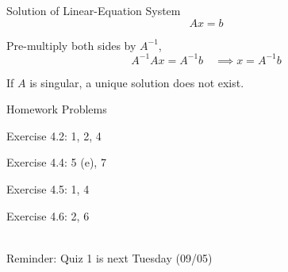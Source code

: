 \documentclass{./../../Latex/teaching_slides}
\begin{document}
\begin{frame}{Solution of Linear-Equation System}
$$ Ax = b $$
\pause

\vspace{1em}
Pre-multiply both sides by $A^{-1}$, 
$$ A^{-1} Ax = A^{-1} b \quad \implies x = A^{-1} b $$

\pause If $A$ is singular, a unique solution does not exist. 
\end{frame}

\begin{frame}{Homework Problems}
  \begin{witemize}
  \normalsize
  \item Exercise 4.2: 1, 2, 4
  \item Exercise 4.4: 5 (e), 7
  \item Exercise 4.5: 1, 4 
  \item Exercise 4.6: 2, 6 \\~\\
\end{witemize}
Reminder: Quiz 1 is next Tuesday (09/05)
\end{frame}
\end{document}
